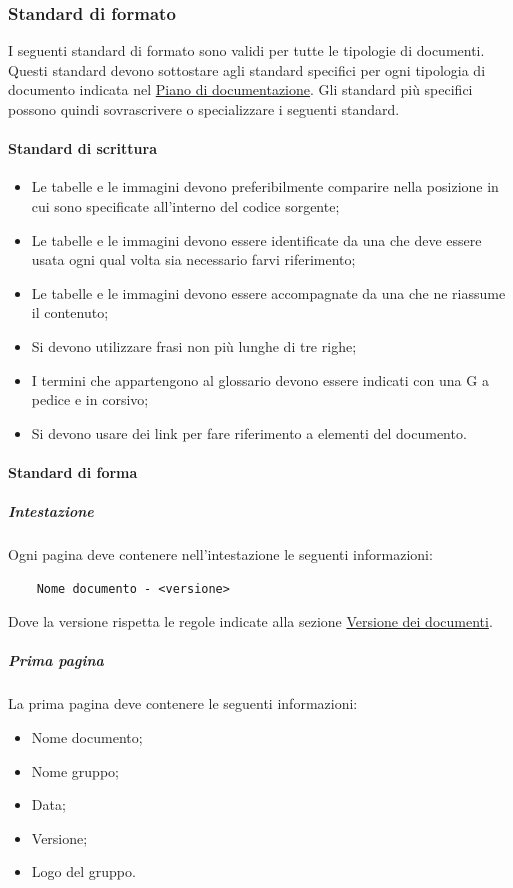 \subsubsection{Standard di formato}
I seguenti standard di formato sono validi per tutte le tipologie di documenti.
Questi standard devono sottostare agli standard specifici per ogni tipologia di documento indicata nel \hyperref[subsubsec:piano_documentazione]{Piano di documentazione}.
Gli standard più specifici possono quindi sovrascrivere o specializzare i seguenti standard.

\paragraph{Standard di scrittura}
\begin{itemize}
    \item Le tabelle e le immagini devono preferibilmente comparire nella posizione in cui sono specificate all'interno del codice sorgente;
    \item Le tabelle e le immagini devono essere identificate da una  che deve essere usata ogni qual volta sia necessario farvi riferimento;
    \item Le tabelle e le immagini devono essere accompagnate da una  che ne riassume il contenuto;
    \item Si devono utilizzare frasi non più lunghe di tre righe;
    \item I termini che appartengono al glossario devono essere indicati con una G a pedice e in corsivo;
    \item Si devono usare dei link per fare riferimento a elementi del documento.
\end{itemize}

\paragraph{Standard di forma}

\subparagraph{Intestazione}
Ogni pagina deve contenere nell'intestazione le seguenti informazioni:
\begin{lstlisting}
    Nome documento - <versione>
\end{lstlisting}
Dove la versione rispetta le regole indicate alla sezione \hyperref[par:versione_documenti]{Versione dei documenti}. 

\subparagraph{Prima pagina}
La prima pagina deve contenere le seguenti informazioni:
\begin{itemize}
    \item Nome documento;     
    \item Nome gruppo;
    \item Data; 
    \item Versione;
    \item Logo del gruppo.
\end{itemize}

